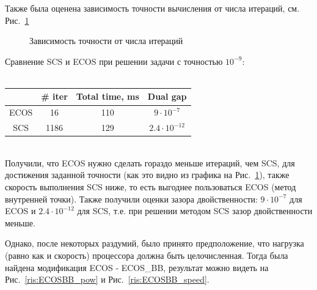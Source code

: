 \documentclass{article}
\begin{document}
Также была оценена зависимость точности вычисления от числа итераций, см. Рис.~\ref{ris:PREC_iter}\\

\centering
\begin{figure}[h]
\caption{Зависимость точности от числа итераций}
\label{ris:PREC_iter}
\end{figure}

Сравнение SCS и ECOS при решении задачи с точностью $10^{-9}$:\\
\\
\begin{center}
\begin{tabular}{c|c|c|c}
     &  \# iter & Total time, ms & Dual gap \\
     \hline
     ECOS & 16 &110 & $9\cdot{10^{-7}}$ \\
     \hline
     SCS & 1186 & 129& $2.4\cdot{10^{-12}}$ \\
\end{tabular}
\end{center}\\

Получили, что ECOS нужно сделать гораздо меньше итераций, чем SCS, для достижения заданной точности (как это видно из графика на Рис.~\ref{ris:PREC_iter}), также скорость выполнения SCS ниже, то есть выгоднее пользоваться ECOS (метод внутренней точки). Также получили оценки зазора двойственности: $9\cdot{10^{-7}}$ для ECOS и $2.4\cdot{10^{-12}}$ для SCS, т.е. при решении методом SCS зазор двойственности меньше. 

Однако, после некоторых раздумий, было принято предположение, что нагрузка (равно как и скорость) процессора должна быть целочисленная. Тогда была найдена модификация ECOS - ECOS\_BB, результат можно видеть на Рис.~\ref{ris:ECOSBB_pow} и Рис.~\ref{ris:ECOSBB_speed}.
\end{document}

